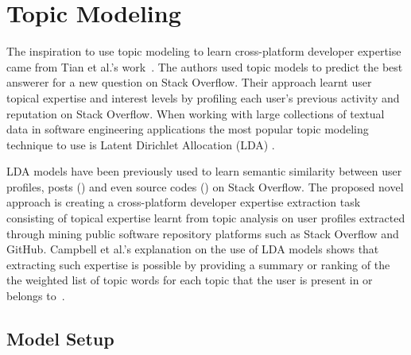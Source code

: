 \section{Topic Modeling\label{sec:topic_modeling}}

    The inspiration to use topic modeling to learn cross-platform developer expertise came from Tian et al.'s work~\cite{tian2013predicting}. The authors used topic models to predict the best answerer for a new question on Stack Overflow. Their approach learnt user topical expertise and interest levels by profiling each user's previous activity and reputation on Stack Overflow. When working with large collections of textual data in software engineering applications the most popular topic modeling technique to use is Latent Dirichlet Allocation (LDA) \cite{campbell2015latent}. 
    
    LDA models have been previously used to learn semantic similarity between user profiles, posts (\cite{tian2013predicting}) and even source codes (\cite{arwan2015source}) on Stack Overflow. The proposed novel approach is creating a cross-platform developer expertise extraction task consisting of topical expertise learnt from topic analysis on user profiles extracted through mining public software repository platforms such as Stack Overflow and GitHub. Campbell et al.'s explanation on the use of LDA models shows that extracting such expertise is possible by providing a summary or ranking of the the weighted list of topic words for each topic that the user is present in or belongs to~\cite{campbell2015latent}. 
        
    \subsection{Model Setup} \label{activeUser_Def}
    
